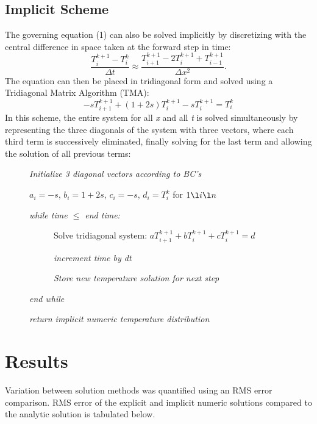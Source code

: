 \documentclass[twocolumn,10pt]{asme2ej}
\begin{document}
\subsection{Implicit Scheme}
The governing equation (1) can also be solved implicitly by discretizing with the central difference in space taken at the forward step in time:
\begin{equation}
\frac{T_i^{k+1}-T_i^k}{\Delta t} \approx \frac{T_{i+1}^{k+1} - 2T_i^{k+1} + T_{i-1}^{k+1}}{\Delta x^2}.
\label{eq_IMPDISCRETE}
\end{equation}
\noindent The equation can then be placed in tridiagonal form and solved using a Tridiagonal Matrix Algorithm (TMA):
\begin{equation}
 -sT_{i+1}^{k+1} +(1+ 2s)T_i^{k+1} - sT_{i}^{k+1} = T_i^{k}
\label{eq_IMPSOLN}
\end{equation}
\noindent In this scheme, the entire system for all \emph{x} and all \emph{t} is solved simultaneously by representing the three diagonals of the system with three vectors, where each third term is successively eliminated, finally solving for the last term and allowing the solution of all previous terms:
\begin{description}
\item[] \emph{Initialize 3 diagonal vectors according to BC's}
\item[] $a_i = -s$, $b_i = 1 + 2s$, $c_i = -s$, $d_i =  T_i^{k}$ for $1 \l i \l n$
\item[] \emph{while time $\leq$ end time:}
	\begin{description}
	\item[] Solve tridiagonal system: $aT_{i+1}^{k+1} + bT_i^{k+1} + cT_{i}^{k+1} = d$
	\item[] \emph{increment time by dt}
	\item[] \emph{Store new temperature solution for next step}
	\end{description}
\item[] \emph{end while}
\item[] \emph{return implicit numeric temperature distribution}
\end{description}

\section{Results}

Variation between solution methods was quantified using an RMS error comparison.  RMS error of the explicit and implicit numeric solutions compared to the analytic solution is tabulated below.
\end{document}
